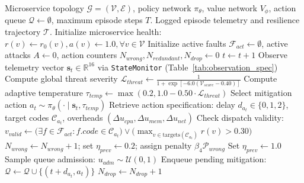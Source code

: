 \documentclass[ASNA,twocolumn]{USG}
\begin{document}
\begin{algorithm}[!htbp]
\caption{SecChaos-RL Closed-Loop Mitigation and Healing Execution}
\label{alg:secchaos_execution}
\small
\begin{algorithmic}[1]
\Require Microservice topology $\mathcal{G} = (\mathcal{V}, \mathcal{E})$, policy network $\pi_\theta$, value network $V_\phi$, action queue $\mathcal{Q} \leftarrow \emptyset$, maximum episode steps $T$.
\Ensure Logged episode telemetry and resilience trajectory $\mathcal{T}$.
\State Initialize microservice health: $r(v) \leftarrow r_0(v), a(v) \leftarrow 1.0, \forall v \in \mathcal{V}$
\State Initialize active faults $\mathcal{F}_{act} \leftarrow \emptyset$, active attacks $A \leftarrow 0$, action counters $N_{wrong}, N_{redundant}, N_{drop} \leftarrow 0$
    \State $t \leftarrow t + 1$
    \State Observe telemetry vector $\mathbf{s}_t \in \mathbb{R}^{16}$ via \texttt{StateMonitor} (Table~\ref{tab:observation_spec})
    \State Compute global threat severity $\mathcal{L}_{threat} \leftarrow \frac{1}{1 + \exp[-6.0(\mathcal{V}_{score} - 0.40)]}$
    \State Compute adaptive temperature $\tau_{temp} \leftarrow \max(0.2, 1.0 - 0.50 \cdot \mathcal{L}_{threat})$
    \State Select mitigation action $a_t \sim \pi_\theta(\cdot \mid \mathbf{s}_t, \tau_{temp})$ 
     
        \State Retrieve action specification: delay $d_{a_t} \in \{0, 1, 2\}$, target codes $\mathcal{C}_{a_t}$, overheads $(\Delta u_{cpu}, \Delta u_{mem}, \Delta u_{net})$
        \State Check dispatch validity: $v_{valid} \leftarrow \big(\exists f \in \mathcal{F}_{act}: f.code \in \mathcal{C}_{a_t}\big) \lor \big(\max_{v \in \text{targets}(\mathcal{C}_{a_t})} r(v) > 0.30\big)$
         
            \State $N_{wrong} \leftarrow N_{wrong} + 1$; set $\eta_{prev} \leftarrow 0.2$; assign penalty $\beta_4 \mathcal{P}_{wrong}$
        \Else {}
            \State Set $\eta_{prev} \leftarrow 1.0$
            \State Sample queue admission: $u_{adm} \sim \mathcal{U}(0, 1)$ 
                \State Enqueue pending mitigation: $\mathcal{Q} \leftarrow \mathcal{Q} \cup \{(t + d_{a_t}, a_t)\}$
            \Else {}
                \State $N_{drop} \leftarrow N_{drop} + 1$ 

\end{algorithmic}
\end{algorithm}
\end{document}
